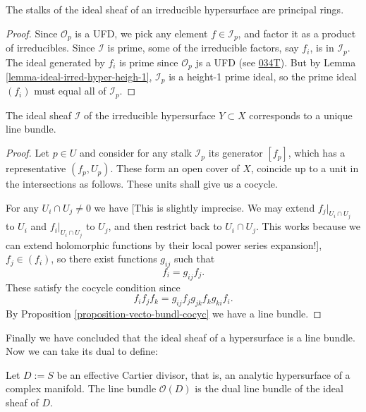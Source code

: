 \documentclass{book}
\begin{document}
\begin{lemma}
\label{lemma-stalk-ideal-sheaf-princ-hyper}
The stalks of the ideal sheaf of
an irreducible hypersurface
are principal rings.
\end{lemma}

\begin{proof}
Since $\mathcal{O}_p$
is a UFD, we pick any element
$f \in \mathcal{I}_p$, and factor it as a
product of irreducibles.
Since $\mathcal{I}$ is prime, some of the
irreducible factors,
say $f_i$, is in $\mathcal{I}_p$.
The ideal generated by $f_i$ is prime since
$\mathcal{O}_p$
js a UFD (see
\href{https://stacks.math.columbia.edu/tag/%
034T}{034T}).
But by Lemma
\ref{lemma-ideal-irred-hyper-heigh-1},
$\mathcal{I}_p$ is a height-1 prime ideal, so
the prime ideal $(f_i)$
must equal all of $\mathcal{I}_p$.
\end{proof}

\begin{lemma}
\label{lemma-ideal-sheaf-irred-hyper-line}
The ideal sheaf $\mathcal{I}$
of the irreducible hypersurface $Y \subset X$
corresponds to a unique line bundle.
\end{lemma}

\begin{proof}
Let $p \in U$ and consider for any stalk
$\mathcal{I}_p$
its generator $[f_p]$,
which has a representative $(f_p,U_p)$.
These form an open cover of $X$,
coincide up to a unit in the intersections as
follows.
These units shall give us a cocycle.

For any $U_i\cap U_j \neq 0$
we have
[This is slightly imprecise.
We may extend $f_j|_{U_i\cap U_j}$ to $U_i$
and $f_i|_{U_i\cap U_j}$ to $U_j$,
and then restrict back to $U_i\cap U_j$.
This works because we can extend holomorphic
functions by their local power series
expansion!],
$f_j\in (f_i)$, so there exist functions
$g_{ij}$ such that
$$
f_i=g_{ij}f_j.
$$
These satisfy the cocycle condition since
$$
f_if_jf_k=g_{ij}f_jg_{jk}f_kg_{ki}f_i.
$$
By Proposition
\ref{proposition-vecto-bundl-cocyc} we have a
line
bundle.
\end{proof}

\noindent
Finally we have concluded that the ideal
sheaf
of a hypersurface is a line bundle. Now we
can take its dual to define:

\begin{definition}
\label{definition-sheaf-assoc-effec-carti}
Let $D:=S$ be an effective Cartier divisor,
that is,
an analytic hypersurface of a complex
manifold.
The line bundle $\mathcal{O}(D)$ is the dual
line bundle
of the ideal sheaf of $D$.
\end{definition}
\end{document}
